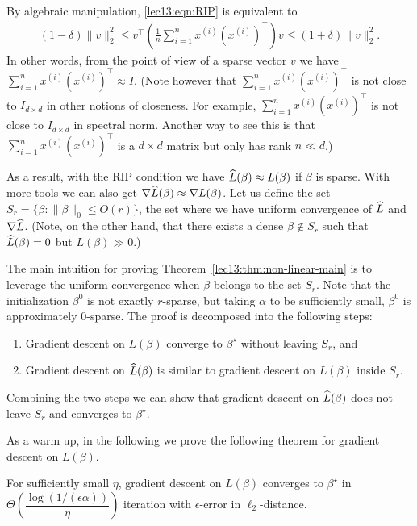 By algebraic manipulation, \eqref{lec13:eqn:RIP} is equivalent to 
\begin{align}\label{lec13:eqn:RIP-2}
(1-\delta)\|v\|_2^2\le v^\top \left(\frac{1}{n}\sum_{i=1}^{n}x^{(i)}(x^{(i)})^\top\right)v\le (1+\delta)\|v\|_2^2.
\end{align}
In other words, from the point of view of a sparse vector $v$ we have $\sum_{i=1}^{n}x^{(i)}(x^{(i)})^\top\approx I$. (Note however that $\sum_{i=1}^{n}x^{(i)}(x^{(i)})^\top$ is not close to $I_{d\times d}$ in other notions of closeness. For example, $\sum_{i=1}^{n}x^{(i)}(x^{(i)})^\top$ is not close to $I_{d\times d}$ in spectral norm. Another way to see this is that $\sum_{i=1}^{n}x^{(i)}(x^{(i)})^\top$ is a $d \times d$ matrix but only has rank $n \ll d$.)

As a result, with the RIP condition we have $\widehat{L}(\beta)\approx L(\beta)$ if $\beta$ is sparse. With more tools we can also get $\nabla \widehat{L}(\beta)\approx \nabla L(\beta)$. Let us define the set $S_r=\{\beta:\|\beta\|_0\le O(r)\}$, the set where we have uniform convergence of $\widehat{L}$ and $\nabla \widehat{L}$. (Note, on the other hand, that there exists a dense $\beta\not\in S_r$ such that $\widehat{L}(\beta)=0$ but $L(\beta)\gg 0.$)

The main intuition for proving Theorem~\ref{lec13:thm:non-linear-main} is to leverage the uniform convergence when $\beta$ belongs to the set $S_r.$ Note that the initialization $\beta^0$ is not exactly $r$-sparse, but taking $\alpha$ to be sufficiently small, $\beta^0$ is approximately $0$-sparse. The proof is decomposed into the following steps:

\begin{enumerate}
    \item Gradient descent on $L(\beta)$ converge to $\beta^\star$ without leaving $S_r$, and
    \item Gradient descent on $\widehat{L}(\beta)$ is similar to gradient descent on $L(\beta)$ inside $S_r$.
\end{enumerate}

Combining the two steps we can show that gradient descent on $\widehat{L}(\beta)$ does not leave $S_r$ and converges to $\beta^\star.$

As a warm up, in the following we prove the following theorem for gradient descent on $L(\beta).$
\begin{theorem}
For sufficiently small $\eta$, gradient descent on $L(\beta)$ converges to $\beta^\star$ in $\Theta\left(\dfrac{\log (1/ (\epsilon\alpha) )}{\eta}\right)$ iteration with $\epsilon$-error in $\ell_2$-distance.
\end{theorem}

